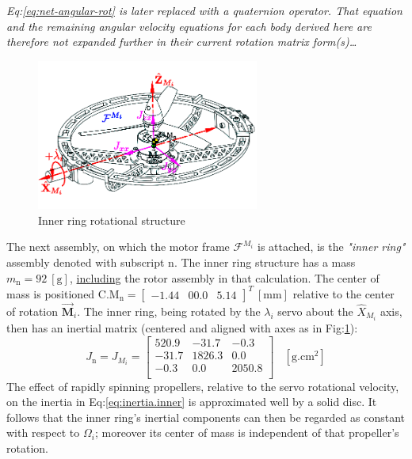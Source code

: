 \emph{\color{gray} Eq:\ref{eq:net-angular-rot} is later replaced with a quaternion operator. That equation and the remaining angular velocity equations for each body derived here are therefore not expanded further in their current rotation matrix form(s)\ldots}
\par
\begin{figure}[htbp]
\vspace{-20pt}
\centering
\includegraphics[width=0.65\textwidth]{figs/inertia-inner}
\vspace{-6pt}
\caption{Inner ring rotational structure}
\label{fig:inertia-inner}
\end{figure}
The next assembly, on which the motor frame $\mathcal{F}^{M_i}$ is attached, is the \emph{"inner ring"} assembly denoted with subscript n. The inner ring structure has a mass $m_\text{n}=92~[\text{g}]$, \underline{including} the rotor assembly in that calculation. The center of mass is positioned $\text{C.M}_{\text{n}}=\begin{bmatrix}-1.44&00.0&5.14\end{bmatrix}^T~[\text{mm}]$ relative to the center of rotation $\vec{\mathbf{M}}_i$. The inner ring, being rotated by the $\lambda_i$ servo about the $\hat{X}_{M_i}$ axis, then has an inertial matrix (centered and aligned with axes as in Fig:\ref{fig:inertia-inner}):
\begin{equation} \label{eq:inertia.inner}
J_\text{n}=J_{M_i}=\begin{bmatrix}
520.9 & -31.7	& -0.3\\
-31.7 & 1826.3 & 0.0\\
-0.3 & 0.0	& 2050.8\\
\end{bmatrix}~~~~[\text{g.cm}^2]
\end{equation}
The effect of rapidly spinning propellers, relative to the servo rotational velocity, on the inertia in Eq:\ref{eq:inertia.inner} is approximated well by a solid disc. It follows that the inner ring's inertial components can then be regarded as constant with respect to $\Omega_i$; moreover its center of mass is independent of that propeller's rotation.
